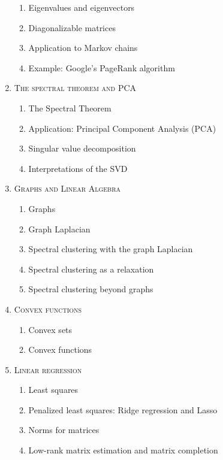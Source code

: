 \begin{enumerate}[label=\textbf{\arabic*.}]
\vspace{-0.2cm}
\begin{enumerate}[label=\arabic*.,noitemsep]
\item Eigenvalues and eigenvectors
\item Diagonalizable matrices
\item Application to Markov chains
\item Example: Google's PageRank algorithm
\end{enumerate}
\item \textsc{The spectral theorem and PCA}
\vspace{-0.2cm}
\begin{enumerate}[label=\arabic*.,noitemsep]
\item The Spectral Theorem
\item Application: Principal Component Analysis (PCA)
\item Singular value decomposition
\item Interpretations of the SVD
\end{enumerate}
\item \textsc{Graphs and Linear Algebra}
\vspace{-0.2cm}
\begin{enumerate}[label=\arabic*.,noitemsep]
\item Graphs
\item Graph Laplacian
\item Spectral clustering with the graph Laplacian
\item Spectral clustering as a relaxation
\item Spectral clustering beyond graphs
\end{enumerate}
\item \textsc{Convex functions}
\vspace{-0.2cm}
\begin{enumerate}[label=\arabic*.,noitemsep]
\item Convex sets
\item Convex functions
\end{enumerate}
\item \textsc{Linear regression}
\vspace{-0.2cm}
\begin{enumerate}[label=\arabic*.,noitemsep]
\item Least squares
\item Penalized least squares: Ridge regression and Lasso
\item Norms for matrices
\item Low-rank matrix estimation and matrix completion

\end{enumerate}
\end{enumerate}
